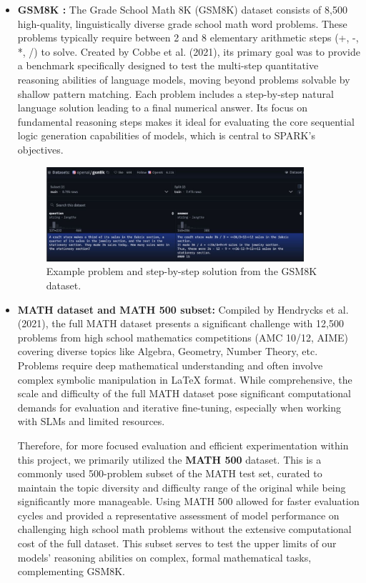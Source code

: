 \documentclass[11pt]{article}
\begin{document}
\begin{itemize}
    \item \textbf{GSM8K \cite{gsm8k}:}
    The Grade School Math 8K (GSM8K) dataset consists of 8,500 high-quality, linguistically diverse grade school math word problems. These problems typically require between 2 and 8 elementary arithmetic steps (+, -, *, /) to solve. Created by Cobbe et al. (2021), its primary goal was to provide a benchmark specifically designed to test the multi-step quantitative reasoning abilities of language models, moving beyond problems solvable by shallow pattern matching. Each problem includes a step-by-step natural language solution leading to a final numerical answer. Its focus on fundamental reasoning steps makes it ideal for evaluating the core sequential logic generation capabilities of models, which is central to SPARK's objectives.

    \begin{figure}[h!]
        \centering
        \includegraphics[width=0.9\textwidth]{GSM8k.png} %
        \caption{Example problem and step-by-step solution from the GSM8K dataset.}
        \label{fig:gsm8k_example}
    \end{figure}

    \item \textbf{MATH dataset \cite{hendrycksmath2021} and MATH 500 subset:}
    Compiled by Hendrycks et al. (2021), the full MATH dataset presents a significant challenge with 12,500 problems from high school mathematics competitions (AMC 10/12, AIME) covering diverse topics like Algebra, Geometry, Number Theory, etc. Problems require deep mathematical understanding and often involve complex symbolic manipulation in LaTeX format. While comprehensive, the scale and difficulty of the full MATH dataset pose significant computational demands for evaluation and iterative fine-tuning, especially when working with SLMs and limited resources.

    Therefore, for more focused evaluation and efficient experimentation within this project, we primarily utilized the \textbf{MATH 500} dataset. This is a commonly used 500-problem subset of the MATH test set, curated to maintain the topic diversity and difficulty range of the original while being significantly more manageable. Using MATH 500 allowed for faster evaluation cycles and provided a representative assessment of model performance on challenging high school math problems without the extensive computational cost of the full dataset. This subset serves to test the upper limits of our models' reasoning abilities on complex, formal mathematical tasks, complementing GSM8K.


\end{itemize}
\end{document}

